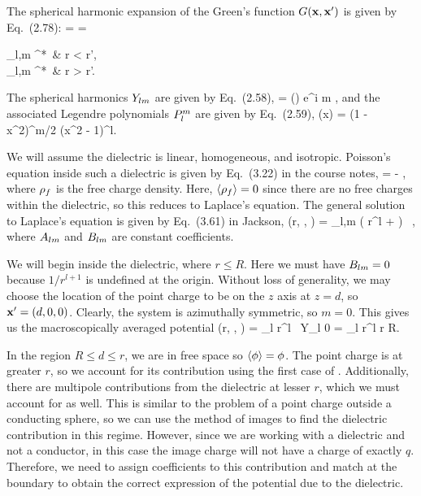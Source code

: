 \begin{solution}
	The spherical harmonic expansion of the Green's function $G(\vb{x}, \vb{x}')$ is given by Eq.~(2.78):
	\beqn \label{greenexp}
		\Gxxp = 
		= \begin{cases}
			\dsum_{l,m}   \Ylm^*\tvp \, \Ylm\tv & \tif r < r', \\[2ex]
			\dsum_{l,m}   \Ylm^*\tvp \, \Ylm\tv & \tif r > r'.
		\end{cases}
	\eeqn
	The spherical harmonics $Y_{l m}$ are given by Eq.~(2.58),
	\beq
		\Ylm\tv =   \Plm(\cost) e^{i m \vph},
	\eeq
	and the associated Legendre polynomials $P_l^m$ are given by Eq.~(2.59),
	\beq
		\Plm(x) =  (1 - x^2)^{m/2}  (x^2 - 1)^l.
	\eeq	
	
	We will assume the dielectric is linear, homogeneous, and isotropic.  Poisson's equation inside such a dielectric is given by Eq.~(3.22) in the course notes,
	\beq
		\lap\evphi = -\frac{4\pi}{\eps} \evrhof\!,
	\eeq
	where $\rho_f$ is the free charge density.  Here, $\evrhof = 0$ since there are no free charges within the dielectric, so this reduces to Laplace's equation.  The general solution to Laplace's equation is given by Eq.~(3.61) in Jackson,
	\beqn \label{lapsol}
		\evphi\!(r, \tht, \vph) = \sum_{l,m} \left( \Alm r^l +  \right) \, \Ylm\tv,
	\eeqn
	where $A_{l m}$ and $B_{l m}$ are constant coefficients.
	
	We will begin inside the dielectric, where $r \leq R$.  Here we must have $B_{l m} = 0$ because $1/r^{l+1}$ is undefined at the origin.  Without loss of generality, we may choose the location of the point charge to be on the $z$ axis at $z = d$, so $\vb{x}' = (d, 0, 0)$.  Clearly, the system is azimuthally symmetric, so $m = 0$.  This gives us the macroscopically averaged potential
	\beqn \label{inside}
		\evphi\!(r, \tht, \vph) = \sum_{l} \Al r^l \, Y_{l 0}\tv
		= \sum_{l}  \Al r^l \Plct \quad \tif r \leq R.
	\eeqn
	
	In the region $R \leq d \leq r$, we are in free space so $\evphi = \phi$.  The point charge is at greater $r$, so we account for its contribution using the first case of .  Additionally, there are multipole contributions from the dielectric at lesser $r$, which we must account for as well.  This is similar to the problem of a point charge outside a conducting sphere, so we can use the method of images to find the dielectric contribution in this regime.  However, since we are working with a dielectric and not a conductor, in this case the image charge will not have a charge of exactly $q$.  Therefore, we need to assign coefficients to this contribution and match at the boundary to obtain the correct expression of the potential due to the dielectric.
	

\end{solution}

